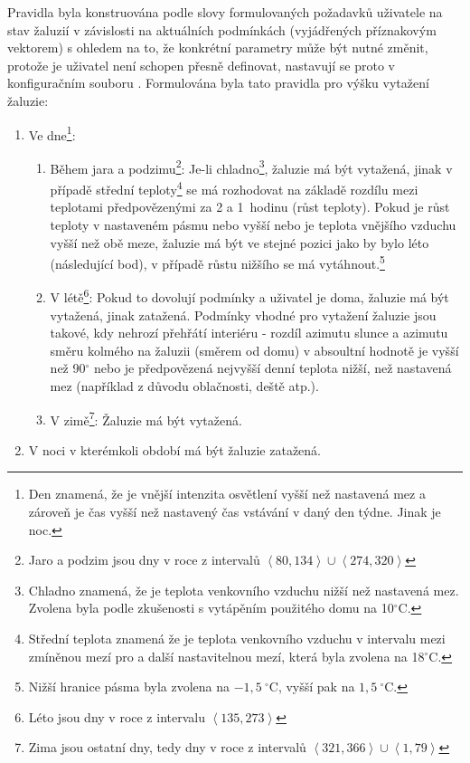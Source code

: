         Pravidla byla konstruována podle slovy formulovaných požadavků uživatele na stav žaluzií v závislosti na aktuálních podmínkách (vyjádřených příznakovým vektorem) s ohledem na to, že konkrétní parametry může být nutné změnit, protože je uživatel není schopen přesně definovat, nastavují se proto v konfiguračním souboru . Formulována byla tato pravidla pro výšku vytažení žaluzie:
        \begin{enumerate}
            \item Ve dne\footnote{Den znamená, že je vnější intenzita osvětlení vyšší než nastavená mez a zároveň je čas vyšší než nastavený čas vstávání v daný den týdne. Jinak je noc.}:
            \begin{enumerate}
                \item Během jara a podzimu\footnote{Jaro a podzim jsou dny v roce z intervalů $\left\langle 80, 134\right\rangle \cup  \left\langle 274, 320\right\rangle $}: Je-li chladno\footnote{Chladno znamená, že je teplota venkovního vzduchu nižší než nastavená mez. Zvolena byla podle zkušenosti s vytápěním použitého domu na 10$^\circ$C.}, žaluzie má být vytažená, jinak v případě střední teploty\footnote{Střední teplota znamená že je teplota venkovního vzduchu v intervalu mezi zmíněnou mezí pro  a další nastavitelnou mezí, která byla zvolena na 18$^\circ$C.} se má rozhodovat na základě rozdílu mezi teplotami předpovězenými za 2 a 1~hodinu (růst teploty). Pokud je růst teploty v nastaveném pásmu nebo vyšší nebo je teplota vnějšího vzduchu vyšší než obě meze, žaluzie má být ve stejné pozici jako by bylo léto (následující bod), v případě růstu nižšího se má vytáhnout.\footnote{Nižší hranice pásma byla zvolena na $-1{,}5~^\circ \mathrm{C}$, vyšší pak na $1{,}5~^\circ \mathrm{C}$.}
                \item V létě\footnote{Léto jsou dny v roce z intervalu $\left\langle 135, 273\right\rangle$}: Pokud to dovolují podmínky a uživatel je doma, žaluzie má být vytažená, jinak zatažená. Podmínky vhodné pro vytažení žaluzie jsou takové, kdy nehrozí přehřátí interiéru - rozdíl azimutu slunce a azimutu směru kolmého na žaluzii (směrem od domu) v absoultní hodnotě je vyšší než 90$^\circ$ nebo je předpovězená nejvyšší denní teplota nižší, než nastavená mez (například z důvodu oblačnosti, deště atp.).
                \item V zimě\footnote{Zima jsou ostatní dny, tedy dny v roce z intervalů $\left\langle 321, 366\right\rangle \cup \left\langle 1, 79\right\rangle $}: Žaluzie má být vytažená.
            \end{enumerate}
            \item V noci v kterémkoli období má být žaluzie zatažená.
        \end{enumerate}
